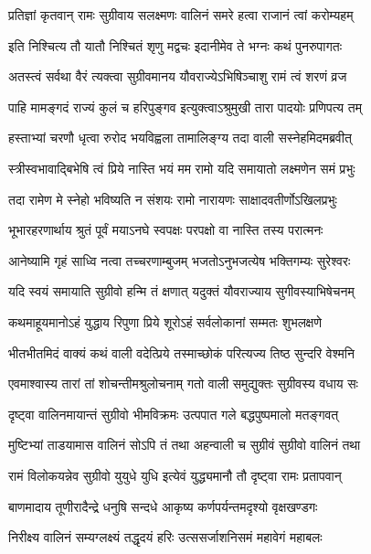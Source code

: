 \twolineshloka
{प्रतिज्ञां कृतवान् रामः सुग्रीवाय सलक्ष्मणः}
{वालिनं समरे हत्वा राजानं त्वां करोम्यहम्} %

\twolineshloka
{इति निश्चित्य तौ यातौ निश्चितं शृणु मद्वचः}
{इदानीमेव ते भग्नः कथं पुनरुपागतः} %

\twolineshloka
{अतस्त्वं सर्वथा वैरं त्यक्त्वा सुग्रीवमानय}
{यौवराज्येऽभिषिञ्चाशु रामं त्वं शरणं व्रज} %

\twolineshloka
{पाहि मामङ्गदं राज्यं कुलं च हरिपुङ्गव}
{इत्युक्त्वाऽश्रुमुखी तारा पादयोः प्रणिपत्य तम्} %

\twolineshloka
{हस्ताभ्यां चरणौ धृत्वा रुरोद भयविह्वला}
{तामालिङ्ग्य तदा वाली सस्नेहमिदमब्रवीत्} %

\twolineshloka
{स्त्रीस्वभावाद्बिभेषि त्वं प्रिये नास्ति भयं मम}
{रामो यदि समायातो लक्ष्मणेन समं प्रभुः} %

\twolineshloka
{तदा रामेण मे स्नेहो भविष्यति न संशयः}
{रामो नारायणः साक्षादवतीर्णोऽखिलप्रभुः} %

\twolineshloka
{भूभारहरणार्थाय श्रुतं पूर्वं मयाऽनघे}
{स्वपक्षः परपक्षो वा नास्ति तस्य परात्मनः} %

\twolineshloka
{आनेष्यामि गृहं साध्वि नत्वा तच्चरणाम्बुजम्}
{भजतोऽनुभजत्येष भक्तिगम्यः सुरेश्वरः} %

\twolineshloka
{यदि स्वयं समायाति सुग्रीवो हन्मि तं क्षणात्}
{यदुक्तं यौवराज्याय सुगीवस्याभिषेचनम्} %

\twolineshloka
{कथमाहूयमानोऽहं युद्धाय रिपुणा प्रिये}
{शूरोऽहं सर्वलोकानां सम्मतः शुभलक्षणे} %

\twolineshloka
{भीतभीतमिदं वाक्यं कथं वाली वदेत्प्रिये}
{तस्माच्छोकं परित्यज्य तिष्ठ सुन्दरि वेश्मनि} %

\twolineshloka
{एवमाश्वास्य तारां तां शोचन्तीमश्रुलोचनाम्}
{गतो वाली समुद्युक्तः सुग्रीवस्य वधाय सः} %

\twolineshloka
{दृष्ट्वा वालिनमायान्तं सुग्रीवो भीमविक्रमः}
{उत्पपात गले बद्धपुष्पमालो मतङ्गवत्} %

\twolineshloka
{मुष्टिभ्यां ताडयामास वालिनं सोऽपि तं तथा}
{अहन्वाली च सुग्रीवं सुग्रीवो वालिनं तथा} %

\twolineshloka
{रामं विलोकयन्नेव सुग्रीवो युयुधे युधि}
{इत्येवं युद्ध्यमानौ तौ दृष्ट्वा रामः प्रतापवान्} %

\twolineshloka
{बाणमादाय तूणीरादैन्द्रे धनुषि सन्दधे}
{आकृष्य कर्णपर्यन्तमदृश्यो वृक्षखण्डगः} %

\twolineshloka
{निरीक्ष्य वालिनं सम्यग्लक्ष्यं तद्धृदयं हरिः}
{उत्ससर्जाशनिसमं महावेगं महाबलः} %

